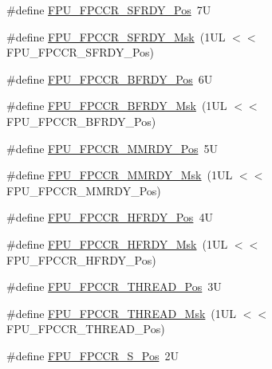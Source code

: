 \begin{DoxyCompactItemize}
\item 
\#define \mbox{\hyperlink{group___c_m_s_i_s___f_p_u_ga571354f040a9372c0ad0cb87e296ea7d}{F\+P\+U\+\_\+\+F\+P\+C\+C\+R\+\_\+\+S\+F\+R\+D\+Y\+\_\+\+Pos}}~7U
\item 
\#define \mbox{\hyperlink{group___c_m_s_i_s___f_p_u_ga419a1e5609bbedf94f518c72214bddbc}{F\+P\+U\+\_\+\+F\+P\+C\+C\+R\+\_\+\+S\+F\+R\+D\+Y\+\_\+\+Msk}}~(1\+U\+L $<$$<$ F\+P\+U\+\_\+\+F\+P\+C\+C\+R\+\_\+\+S\+F\+R\+D\+Y\+\_\+\+Pos)
\item 
\#define \mbox{\hyperlink{group___c_m_s_i_s___f_p_u_ga6d633920f92c3ce4133d769701619b17}{F\+P\+U\+\_\+\+F\+P\+C\+C\+R\+\_\+\+B\+F\+R\+D\+Y\+\_\+\+Pos}}~6U
\item 
\#define \mbox{\hyperlink{group___c_m_s_i_s___f_p_u_gad349eb1323d8399d54a04c0bfd520cb2}{F\+P\+U\+\_\+\+F\+P\+C\+C\+R\+\_\+\+B\+F\+R\+D\+Y\+\_\+\+Msk}}~(1\+U\+L $<$$<$ F\+P\+U\+\_\+\+F\+P\+C\+C\+R\+\_\+\+B\+F\+R\+D\+Y\+\_\+\+Pos)
\item 
\#define \mbox{\hyperlink{group___c_m_s_i_s___f_p_u_gaccdb481211629f9440431439231187f1}{F\+P\+U\+\_\+\+F\+P\+C\+C\+R\+\_\+\+M\+M\+R\+D\+Y\+\_\+\+Pos}}~5U
\item 
\#define \mbox{\hyperlink{group___c_m_s_i_s___f_p_u_gadedfaec9fdd07261573e823a4dcfb5c4}{F\+P\+U\+\_\+\+F\+P\+C\+C\+R\+\_\+\+M\+M\+R\+D\+Y\+\_\+\+Msk}}~(1\+U\+L $<$$<$ F\+P\+U\+\_\+\+F\+P\+C\+C\+R\+\_\+\+M\+M\+R\+D\+Y\+\_\+\+Pos)
\item 
\#define \mbox{\hyperlink{group___c_m_s_i_s___f_p_u_gab12733991487acc2da41ca300fe36fb6}{F\+P\+U\+\_\+\+F\+P\+C\+C\+R\+\_\+\+H\+F\+R\+D\+Y\+\_\+\+Pos}}~4U
\item 
\#define \mbox{\hyperlink{group___c_m_s_i_s___f_p_u_gaf4beaa279abff34828344bd594fff8a1}{F\+P\+U\+\_\+\+F\+P\+C\+C\+R\+\_\+\+H\+F\+R\+D\+Y\+\_\+\+Msk}}~(1\+U\+L $<$$<$ F\+P\+U\+\_\+\+F\+P\+C\+C\+R\+\_\+\+H\+F\+R\+D\+Y\+\_\+\+Pos)
\item 
\#define \mbox{\hyperlink{group___c_m_s_i_s___f_p_u_ga0937d64c42374200af44b22e5b49fd26}{F\+P\+U\+\_\+\+F\+P\+C\+C\+R\+\_\+\+T\+H\+R\+E\+A\+D\+\_\+\+Pos}}~3U
\item 
\#define \mbox{\hyperlink{group___c_m_s_i_s___f_p_u_ga8d18cd88336d63d4b1810383aa8da700}{F\+P\+U\+\_\+\+F\+P\+C\+C\+R\+\_\+\+T\+H\+R\+E\+A\+D\+\_\+\+Msk}}~(1\+U\+L $<$$<$ F\+P\+U\+\_\+\+F\+P\+C\+C\+R\+\_\+\+T\+H\+R\+E\+A\+D\+\_\+\+Pos)
\item 
\#define \mbox{\hyperlink{group___c_m_s_i_s___f_p_u_ga4123d3881e5342251f559cec19e23b4e}{F\+P\+U\+\_\+\+F\+P\+C\+C\+R\+\_\+\+S\+\_\+\+Pos}}~2U
\item 
$$
\end{DoxyCompactItemize}
